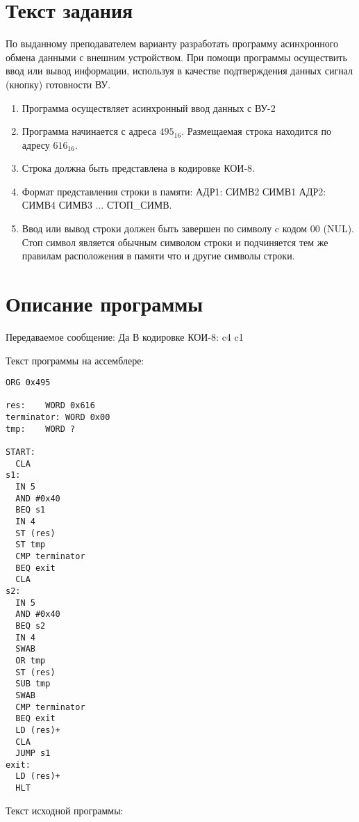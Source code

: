 \documentclass{article}
\begin{document}
\itmo[
  variant=1111,
  labn=5,
  discipline=Основы профессиональной деятельности,
  group=P3115,
  student=Владимир Мацюк,
  teacher=Абузов Ярослав Александрович,
  logo=../../lib/img/itmo.png
]


\section{Текст задания}
По выданному преподавателем варианту разработать программу асинхронного обмена данными с внешним устройством. При помощи программы осуществить ввод или вывод информации, используя в качестве подтверждения данных сигнал (кнопку) готовности ВУ.
\begin{enumerate}
  \item Программа осуществляет асинхронный ввод данных с ВУ-2
  \item Программа начинается с адреса $495_{16}$. Размещаемая строка находится по адресу $616_{16}$.
  \item Строка должна быть представлена в кодировке КОИ-8.
  \item Формат представления строки в памяти: АДР1: СИМВ2 СИМВ1 АДР2: СИМВ4 СИМВ3 ... СТОП\_СИМВ.
  \item Ввод или вывод строки должен быть завершен по символу c кодом 00 (NUL). Стоп символ является обычным символом строки и подчиняется тем же правилам расположения в памяти что и другие символы строки.
\end{enumerate}

\section{Описание программы}

Передаваемое сообщение: Да
В кодировке КОИ-8: c4 c1

Текст программы на ассемблере:

\begin{lstlisting}
ORG 0x495

res:	WORD 0x616
terminator: WORD 0x00
tmp:	WORD ?

START:
  CLA
s1:
  IN 5
  AND #0x40
  BEQ s1
  IN 4
  ST (res)
  ST tmp
  CMP terminator
  BEQ exit
  CLA
s2:
  IN 5
  AND #0x40
  BEQ s2
  IN 4
  SWAB
  OR tmp
  ST (res)
  SUB tmp
  SWAB
  CMP terminator
  BEQ exit
  LD (res)+
  CLA
  JUMP s1
exit:
  LD (res)+
  HLT
\end{lstlisting}

Текст исходной программы:
\end{document}
